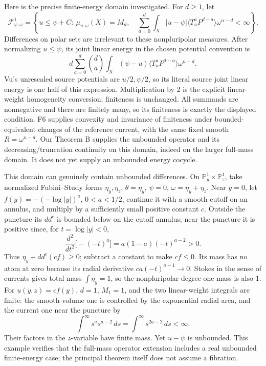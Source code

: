 \documentclass[
  10pt,
]{article}
\begin{document}
Here is the precise finite-energy domain investigated. For \(d\geq1\),
let \[
\mathcal F^1_{\psi,\omega}=\left\{u\leq\psi+C:\ \mu_{u,\omega}(X)=M_d,\quad
\sum_{a=0}^d\int_X|u-\psi|\langle T_u^aP^{d-a}\rangle\omega^{n-d}<\infty\right\}.
\] Differences on polar sets are irrelevant to these nonpluripolar
measures. After normalizing \(u\leq\psi\), its joint linear energy in
the chosen potential convention is \[
d\sum_{a=0}^d\binom da\int_X(\psi-u)\langle T_u^aP^{d-a}\rangle\omega^{n-d}.
\] Vu's unrescaled source potentials are \(u/2,\psi/2\), so its literal
source joint linear energy is one half of this expression.
Multiplication by 2 is the explicit linear-weight homogeneity
conversion; finiteness is unchanged. All summands are nonnegative and
there are finitely many, so its finiteness is exactly the displayed
condition. F6 supplies convexity and invariance of finiteness under
bounded-equivalent changes of the reference current, with the same fixed
smooth \(R=\omega^{n-d}\). Our Theorem B supplies the unbounded operator
and its decreasing/truncation continuity on this domain, indeed on the
larger full-mass domain. It does not yet supply an unbounded energy
cocycle.

This domain can genuinely contain unbounded differences. On
\(\mathbb P^1_y\times\mathbb P^1_z\), take normalized Fubini--Study
forms \(\eta_y,\eta_z\), \(\theta=\eta_y\), \(\psi=0\),
\(\omega=\eta_y+\eta_z\). Near \(y=0\), let \(f(y)=-(-\log|y|)^a\),
\(0<a<1/2\), continue it with a smooth cutoff on an annulus, and
multiply by a sufficiently small positive constant \(c\). Outside the
puncture its \(dd^c\) is bounded below on the cutoff annulus; near the
puncture it is positive since, for \(t=\log|y|<0\), \[
\frac{d^2}{dt^2}\bigl[-(-t)^a\bigr]=a(1-a)(-t)^{a-2}>0.
\] Thus \(\eta_y+dd^c(cf)\geq0\); subtract a constant to make
\(cf\leq0\). Its mass has no atom at zero because its radial derivative
\(ca(-t)^{a-1}\to0\). Stokes in the sense of currents gives total mass
\(\int\eta_y=1\), so the nonpluripolar degree-one mass is also 1. For
\(u(y,z)=cf(y)\), \(d=1\), \(M_1=1\), and the two linear-weight
integrals are finite: the smooth-volume one is controlled by the
exponential radial area, and the current one near the puncture by \[
\int^{\infty}s^a s^{a-2}\,ds=\int^{\infty}s^{2a-2}\,ds<\infty.
\] Their factors in the \(z\)-variable have finite mass. Yet \(u-\psi\)
is unbounded. This example verifies that the full-mass operator
extension includes a real unbounded finite-energy case; the principal
theorem itself does not assume a fibration.
\end{document}
